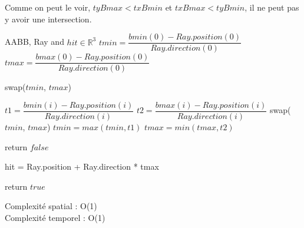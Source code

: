 \nointersection

Comme on peut le voir, $tyBmax < txBmin$ et $txBmax < tyBmin$, il ne peut pas y avoir une intersection.

\begin{algorithm}
\caption{intersection AABB}
\begin{algorithmic}

\Require AABB, Ray and $hit \in \mathbb{R}^{3}$
\State $tmin = \dfrac{bmin(0) - Ray.position(0)}{Ray.direction(0)}$
\State $tmax = \dfrac{bmax(0) - Ray.position(0)}{Ray.direction(0)}$

    \State swap($tmin$, $tmax$)
\EndIf

    \State $t1 = \dfrac{bmin(i) - Ray.position(i)}{Ray.direction(i)}$
    \State $t2 = \dfrac{bmax(i) - Ray.position(i)}{Ray.direction(i)}$
        \State swap($tmin$, $tmax$)
    \EndIf
    \State $tmin = max(tmin, t1)$
    \State $tmax = min(tmax, t2)$

        \State return $false$
    \EndIf
\EndFor

\State hit = Ray.position + Ray.direction * tmax

\State return $true$

\end{algorithmic}
Complexité spatial : O(1)\\
Complexité temporel : O(1)
\end{algorithm}

\pagebreak